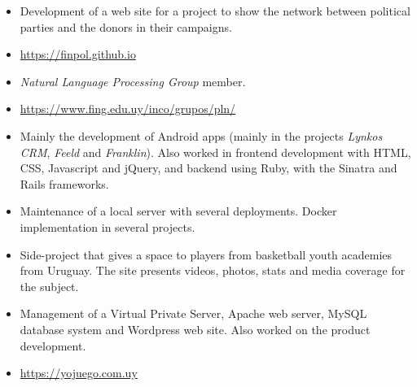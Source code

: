 \documentclass[10pt,a4paper,academicons]{altacv}
\begin{document}
\divider{}


\begin{itemize}
  \item Development of a web site for a project to show the network between political parties and the donors in their campaigns.
  \item \url{https://finpol.github.io}
\end{itemize}

\pagebreak



\begin{itemize}
  \item \emph{Natural Language Processing Group} member.
  \item \url{https://www.fing.edu.uy/inco/grupos/pln/}
\end{itemize}

\divider{}


\begin{itemize}
  \item Mainly the development of Android apps (mainly in the projects \emph{Lynkos CRM}, \emph{Feeld} and \emph{Franklin}). Also worked in frontend development with HTML, CSS, Javascript and jQuery, and backend using Ruby, with the Sinatra and Rails frameworks.
  \item Maintenance of a local server with several deployments. Docker implementation in several projects.
\end{itemize}

\divider{}


\begin{itemize}
  \item Side-project that gives a space to players from basketball youth academies from Uruguay. The site presents videos, photos, stats and media coverage for the subject.
  \item Management of a Virtual Private Server, Apache web server, MySQL database system and Wordpress web site. Also worked on the product development.
  \item \url{https://yojuego.com.uy}
\end{itemize}
\end{document}

